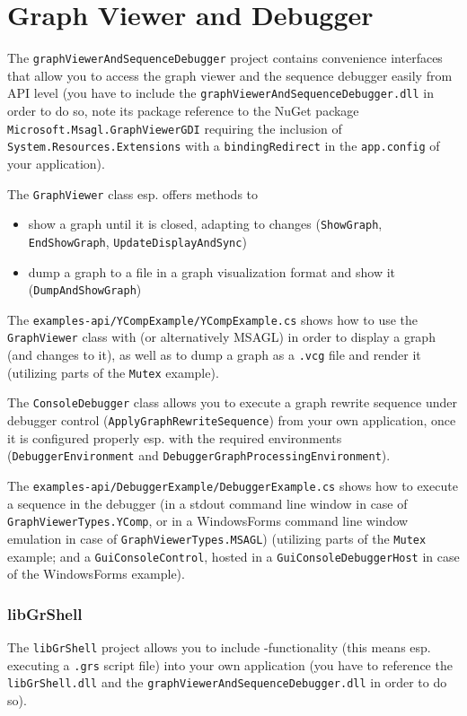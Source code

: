 \section{Graph Viewer and Debugger}
The \texttt{graphViewerAndSequenceDebugger} project contains convenience interfaces that allow you to access the graph viewer and the sequence debugger easily from API level (you have to include the \texttt{graphViewerAndSequenceDebugger.dll} in order to do so, note its package reference to the NuGet package \texttt{Microsoft.Msagl.GraphViewerGDI} requiring the inclusion of \texttt{System.Resources.Extensions} with a \texttt{bindingRedirect} in the \texttt{app.config} of your application).

The \texttt{GraphViewer} class esp. offers methods to
\begin{itemize}
	\item show a graph until it is closed, adapting to changes (\texttt{Show\-Graph}, \texttt{End\-Show\-Graph}, \texttt{Update\-Display\-And\-Sync})
	\item dump a graph to a file in a graph visualization format and show it (\texttt{Dump\-And\-Show\-Graph})
\end{itemize}

The \texttt{examples-api/YCompExample/YCompExample.cs} shows how to use the \texttt{GraphViewer} class with \yComp{} (or alternatively MSAGL) in order to display a graph (and changes to it), as well as to dump a graph as a \texttt{.vcg} file and render it (utilizing parts of the \texttt{Mutex} example).

The \texttt{ConsoleDebugger} class allows you to execute a graph rewrite sequence under debugger control (\texttt{Apply\-Graph\-Rewrite\-Sequence}) from your own application, once it is configured properly esp. with the required environments (\texttt{Debugger\-Environment} and \texttt{Debugger\-Graph\-Processing\-Environment}).

The \texttt{examples-api/DebuggerExample/DebuggerExample.cs} shows how to execute a sequence in the debugger (in a stdout command line window in case of \texttt{GraphViewerTypes.YComp}, or in a WindowsForms command line window emulation in case of \texttt{GraphViewerTypes.MSAGL}) (utilizing parts of the \texttt{Mutex} example; and a \texttt{Gui\-Console\-Control}, hosted in a \texttt{Gui\-Console\-Debugger\-Host} in case of the WindowsForms example).


\subsubsection*{libGrShell}
The \texttt{libGrShell} project allows you to include \GrShell{}-functionality (this means esp. executing a \texttt{.grs} script file) into your own application (you have to reference the \texttt{libGrShell.dll} and the \texttt{graphViewerAndSequenceDebugger.dll} in order to do so).


